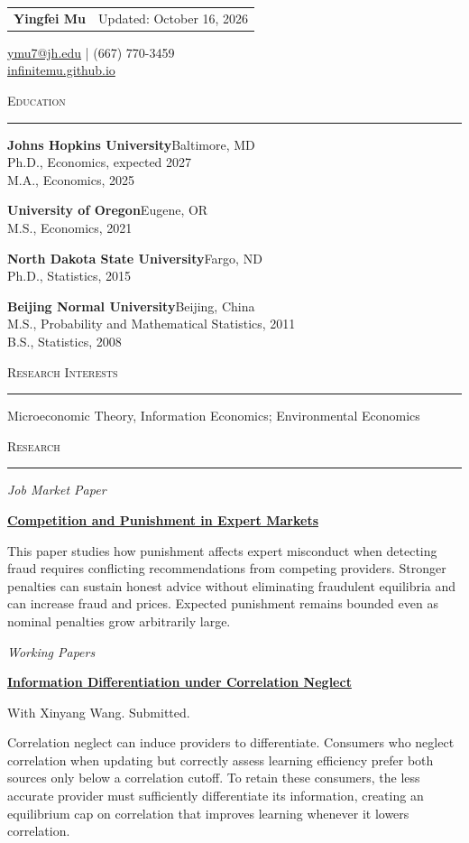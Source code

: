 \documentclass[11pt]{article}
\newcommand{\cvsection}[1]{%
  \vspace{1.1em}
  {\large\scshape #1}\par
  \vspace{0.56em}
  \hrule
  \vspace{0.62em}
}
\newcommand{\institution}[3]{%
  \textbf{#1}\hfill #2\\
  #3\par
}
\newcommand{\researchsubsection}[1]{%
  {\itshape #1}\par
}
\begin{document}
\begin{tabular*}{\textwidth}{@{\extracolsep{\fill}}lr@{}}
{\LARGE\textbf{Yingfei Mu}} & {\footnotesize\textcolor{black!55}{Updated: October 16, 2026}}
\end{tabular*}\par
\vspace{0.45em}
\href{mailto:ymu7@jh.edu}{ymu7@jh.edu} \quad | \quad (667) 770-3459 \\
\href{https://infinitemu.github.io/}{infinitemu.github.io}

\cvsection{Education}
\institution{Johns Hopkins University}{Baltimore, MD}{Ph.D., Economics, expected 2027\\M.A., Economics, 2025}
\vspace{0.6em}
\institution{University of Oregon}{Eugene, OR}{M.S., Economics, 2021}
\vspace{0.6em}
\institution{North Dakota State University}{Fargo, ND}{Ph.D., Statistics, 2015}
\vspace{0.6em}
\institution{Beijing Normal University}{Beijing, China}{M.S., Probability and Mathematical Statistics, 2011\\B.S., Statistics, 2008}

\cvsection{Research Interests}
Microeconomic Theory, Information Economics; Environmental Economics

\cvsection{Research}
\researchsubsection{Job Market Paper}
\vspace{0.35em}

\textbf{\href{https://www.dropbox.com/scl/fi/syjdmc11tqs9vkmqjc36p/punishment.pdf?rlkey=96ybr1n3bgd9m4yh0dgkh5x24&dl=0}{Competition and Punishment in Expert Markets}}\par
\vspace{0.22em}
{\small This paper studies how punishment affects expert misconduct when detecting fraud requires conflicting recommendations from competing providers. Stronger penalties can sustain honest advice without eliminating fraudulent equilibria and can increase fraud and prices. Expected punishment remains bounded even as nominal penalties grow arbitrarily large.\par}

\vspace{0.85em}
\researchsubsection{Working Papers}
\vspace{0.35em}

\textbf{\href{https://papers.ssrn.com/sol3/papers.cfm?abstract_id=7423579}{Information Differentiation under Correlation Neglect}}\par
With Xinyang Wang. Submitted.\par
\vspace{0.22em}
{\small Correlation neglect can induce providers to differentiate. Consumers who neglect correlation when updating but correctly assess learning efficiency prefer both sources only below a correlation cutoff. To retain these consumers, the less accurate provider must sufficiently differentiate its information, creating an equilibrium cap on correlation that improves learning whenever it lowers correlation.\par}
\end{document}
